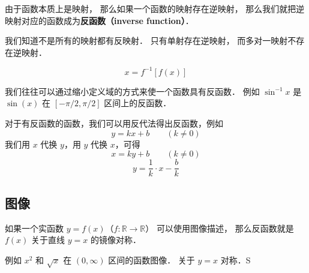 
\begin{issues}
\issueDraft
\end{issues}

由于函数本质上是映射， 那么如果一个函数的映射存在逆映射， 那么我们就把逆映射对应的函数成为\textbf{反函数（inverse function）}．

我们知道不是所有的映射都有反映射． 只有单射存在逆映射， 而多对一映射不存在逆映射．

\begin{equation}
x = f^{-1}[f(x)]
\end{equation}

我们往往可以通过缩小定义域的方式来使一个函数具有反函数． 例如 $\sin^{-1} x$ 是 $\sin(x)$ 在 $[-\pi/2, \pi/2]$ 区间上的反函数．

对于有反函数的函数，我们可以用反代法得出反函数，例如
\begin{equation}
y = kx + b \qquad (k \ne 0)
\end{equation}
我们用 $x$ 代换 $y$，用 $y$ 代换 $x$，可得
\begin{equation}
x = ky + b \qquad (k \ne 0)
\end{equation}
\begin{equation}
y = \frac{1}{k} \cdot x - \frac{b}{k}
\end{equation}

\subsection{图像}
如果一个实函数 $y = f(x)$（$f: \mathbb R \to \mathbb R$） 可以使用图像描述， 那么反函数就是 $f(x)$ 关于直线 $y = x$ 的镜像对称．

例如 $x^2$ 和 $\sqrt{x}$ 在 $(0, \infty)$ 区间的函数图像． 关于 $y = x$ 对称．S
